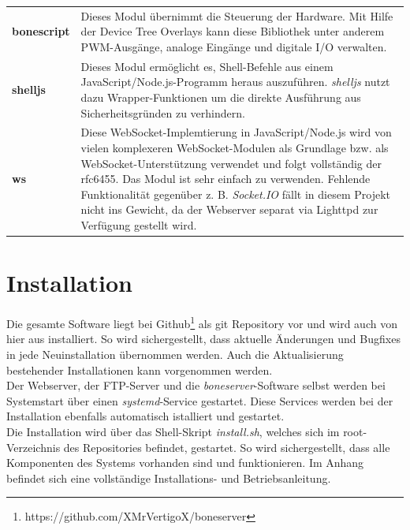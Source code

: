 \begin{longtabu} to \textwidth {
X[1]
X[5]}
\textbf{bonescript} & Dieses Modul übernimmt die Steuerung der Hardware. Mit Hilfe der Device Tree Overlays kann diese Bibliothek unter anderem PWM-Ausgänge, analoge Eingänge und digitale I/O verwalten.\\
\textbf{shelljs} & Dieses Modul ermöglicht es, Shell-Befehle aus einem JavaScript/Node.js-Programm heraus auszuführen. \textit{shelljs} nutzt dazu Wrapper-Funktionen um die direkte Ausführung aus Sicherheitsgründen zu verhindern.\\
\textbf{ws} & Diese WebSocket-Implemtierung in JavaScript/Node.js wird von vielen komplexeren WebSocket-Modulen als Grundlage bzw. als WebSocket-Unterstützung verwendet und folgt vollständig der rfc6455. Das Modul ist sehr einfach zu verwenden. Fehlende Funktionalität gegenüber z. B. \emph{Socket.IO} fällt in diesem Projekt nicht ins Gewicht, da der Webserver separat via Lighttpd zur Verfügung gestellt wird.
\end{longtabu}


\section{Installation}
Die gesamte Software liegt bei Github\footnote{https://github.com/XMrVertigoX/boneserver} als git Repository vor und wird auch von hier aus installiert. So wird sichergestellt, dass aktuelle Änderungen und Bugfixes in jede Neuinstallation übernommen werden. Auch die Aktualisierung bestehender Installationen kann vorgenommen werden.\\
Der Webserver, der FTP-Server und die \textit{boneserver}-Software selbst werden bei Systemstart über einen \textit{systemd}-Service gestartet. Diese Services werden bei der Installation ebenfalls automatisch istalliert und gestartet.\\

Die Installation wird über das Shell-Skript \textit{install.sh}, welches sich im root-Verzeichnis des Repositories befindet, gestartet. So wird sichergestellt, dass alle Komponenten des Systems vorhanden sind und funktionieren. Im Anhang befindet sich eine vollständige Installations- und Betriebsanleitung.